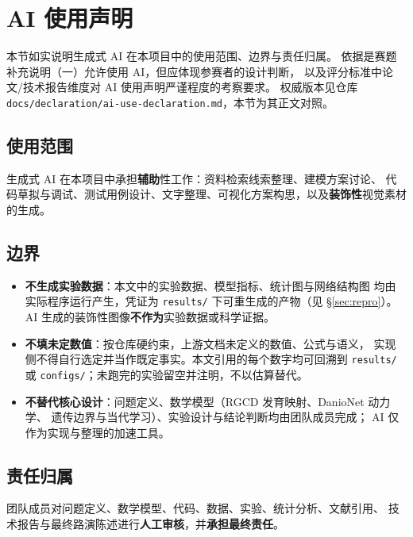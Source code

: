 \section{AI 使用声明}\label{sec:ai-decl}

本节如实说明生成式 AI 在本项目中的使用范围、边界与责任归属。
依据是赛题补充说明（一）允许使用 AI，但应体现参赛者的设计判断，
以及评分标准中论文/技术报告维度对 AI 使用声明严谨程度的考察要求。
权威版本见仓库 \texttt{docs/declaration/ai-use-declaration.md}，本节为其正文对照。

\subsection{使用范围}

生成式 AI 在本项目中承担\textbf{辅助}性工作：资料检索线索整理、建模方案讨论、
代码草拟与调试、测试用例设计、文字整理、可视化方案构思，以及\textbf{装饰性}视觉素材的生成。

\subsection{边界}

\begin{itemize}
  \item \textbf{不生成实验数据}：本文中的实验数据、模型指标、统计图与网络结构图
        均由实际程序运行产生，凭证为 \texttt{results/} 下可重生成的产物（见 \S\ref{sec:repro}）。
        AI 生成的装饰性图像\textbf{不作为}实验数据或科学证据。
  \item \textbf{不填未定数值}：按仓库硬约束，上游文档未定义的数值、公式与语义，
        实现侧不得自行选定并当作既定事实。本文引用的每个数字均可回溯到
        \texttt{results/} 或 \texttt{configs/}；未跑完的实验留空并注明，不以估算替代。
  \item \textbf{不替代核心设计}：问题定义、数学模型（RGCD 发育映射、DanioNet 动力学、
        遗传边界与当代学习）、实验设计与结论判断均由团队成员完成；
        AI 仅作为实现与整理的加速工具。
\end{itemize}

\subsection{责任归属}

团队成员对问题定义、数学模型、代码、数据、实验、统计分析、文献引用、
技术报告与最终路演陈述进行\textbf{人工审核}，并\textbf{承担最终责任}。
